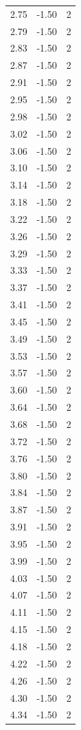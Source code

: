 \begin{longtable}{lrr}
  2.75 & -1.50 & 2 \\
  2.79 & -1.50 & 2 \\
  2.83 & -1.50 & 2 \\
  2.87 & -1.50 & 2 \\
  2.91 & -1.50 & 2 \\
  2.95 & -1.50 & 2 \\
  2.98 & -1.50 & 2 \\
  3.02 & -1.50 & 2 \\
  3.06 & -1.50 & 2 \\
  3.10 & -1.50 & 2 \\
  3.14 & -1.50 & 2 \\
  3.18 & -1.50 & 2 \\
  3.22 & -1.50 & 2 \\
  3.26 & -1.50 & 2 \\
  3.29 & -1.50 & 2 \\
  3.33 & -1.50 & 2 \\
  3.37 & -1.50 & 2 \\
  3.41 & -1.50 & 2 \\
  3.45 & -1.50 & 2 \\
  3.49 & -1.50 & 2 \\
  3.53 & -1.50 & 2 \\
  3.57 & -1.50 & 2 \\
  3.60 & -1.50 & 2 \\
  3.64 & -1.50 & 2 \\
  3.68 & -1.50 & 2 \\
  3.72 & -1.50 & 2 \\
  3.76 & -1.50 & 2 \\
  3.80 & -1.50 & 2 \\
  3.84 & -1.50 & 2 \\
  3.87 & -1.50 & 2 \\
  3.91 & -1.50 & 2 \\
  3.95 & -1.50 & 2 \\
  3.99 & -1.50 & 2 \\
  4.03 & -1.50 & 2 \\
  4.07 & -1.50 & 2 \\
  4.11 & -1.50 & 2 \\
  4.15 & -1.50 & 2 \\
  4.18 & -1.50 & 2 \\
  4.22 & -1.50 & 2 \\
  4.26 & -1.50 & 2 \\
  4.30 & -1.50 & 2 \\
  4.34 & -1.50 & 2 \\

\end{longtable}
